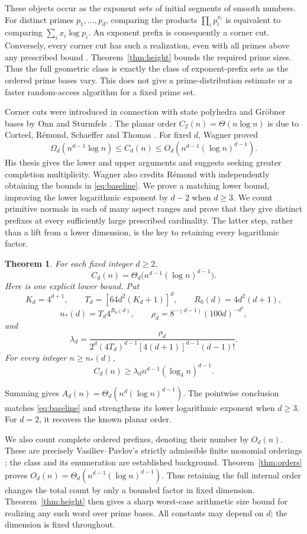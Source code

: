 \documentclass[11pt,a4paper]{article}
\newtheorem{theorem}{Theorem}
\theoremstyle{remark}
\begin{document}
These objects occur as the exponent sets of initial segments of smooth
numbers. For distinct primes \(p_1,\ldots,p_d\), comparing the products
\(\prod_i p_i^{x_i}\) is equivalent to comparing
\(\sum_i x_i\log p_i\). An exponent prefix is consequently a corner cut.
Conversely, every corner cut has such a realization, even with all
primes above any prescribed bound \cite[Proposition 6.2]{Vietri}.
Theorem~\ref{thm:height} bounds the required prime sizes.
Thus the full geometric class is exactly the class of exponent-prefix
sets as the ordered prime bases vary. This does not give a
prime-distribution estimate or a faster random-access algorithm for a
fixed prime set.

Corner cuts were introduced in connection with state polyhedra and
Gr\"obner bases by Onn and Sturmfels \cite{OS}. The planar order
\(C_2(n)=\Theta(n\log n)\) is due to Corteel, R\'emond, Schaeffer and
Thomas \cite{CRST}. For fixed \(d\), Wagner \cite{W02} proved
\[
 \Omega_d(n^{d-1}\log n)\leq C_d(n)
 \leq O_d(n^{d-1}(\log n)^{d-1}).
 \tag{1}\label{eq:baseline}
\]
His thesis \cite[Chapter 3]{W03} gives the lower and upper arguments
and suggests seeking greater completion multiplicity. Wagner also
credits R\'emond with independently obtaining the bounds in
\eqref{eq:baseline}. We prove a matching lower bound, improving the
lower logarithmic exponent by \(d-2\) when \(d\geq3\).
We count primitive normals in each of many aspect ranges and prove
that they give distinct prefixes at every sufficiently large prescribed
cardinality. The latter step, rather than a lift from a lower dimension,
is the key to retaining every logarithmic factor.

\begin{theorem}\label{thm:main}
For each fixed integer \(d\geq2\),
\[
 C_d(n)=\Theta_d\!\bigl(n^{d-1}(\log n)^{d-1}\bigr).
\]
Here is one explicit lower bound. Put
\[
 K_d=4^{d+1},\qquad T_d=[64d^2(K_d+1)]^d,\qquad
 R_0(d)=4d^2(d+1),
\]
\[
 n_*(d)=T_d4^{R_0(d)},\qquad
 \rho_d=8^{-(d-1)}(100d)^{-d^2},
\]
and
\[
 \lambda_d=\frac{\rho_d}
 {2^d(4T_d)^{d-1}[4(d+1)]^{d-1}(d-1)!}.
\]
For every integer \(n\geq n_*(d)\),
\[
 C_d(n)\geq\lambda_d n^{d-1}(\log_4 n)^{d-1}.
 \tag{2}\label{eq:explicit}
\]
\end{theorem}
Summing gives \(A_d(n)=\Theta_d(n^d(\log n)^{d-1})\).
The pointwise conclusion matches \eqref{eq:baseline} and strengthens
its lower logarithmic exponent when \(d\geq3\).
For \(d=2\), it recovers the known planar order.

We also count complete ordered prefixes, denoting their number by
\(O_d(n)\). These are precisely Vasiliev--Pavlov's strictly admissible
finite monomial orderings \cite[Definition 5]{VP}; the class and its
enumeration are established background. Theorem~\ref{thm:orders} proves
\(O_d(n)=\Theta_d(n^{d-1}(\log n)^{d-1})\).
Thus retaining the full internal order changes the total count by only a
bounded factor in fixed dimension. Theorem~\ref{thm:height} then gives a
sharp worst-case arithmetic size bound for realizing any such word over
prime bases. All constants may depend on \(d\); the dimension is fixed
throughout.
\end{document}
